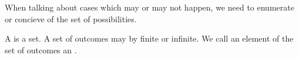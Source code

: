 
\sbasic









\sstart
{}


When talking about cases which
may or may not happen, we need
to enumerate or concieve of the
set of possibilities.


A 
is a set.
A set of outcomes may by finite
or infinite.
We call an element of the
set of outcomes an .
\strats
